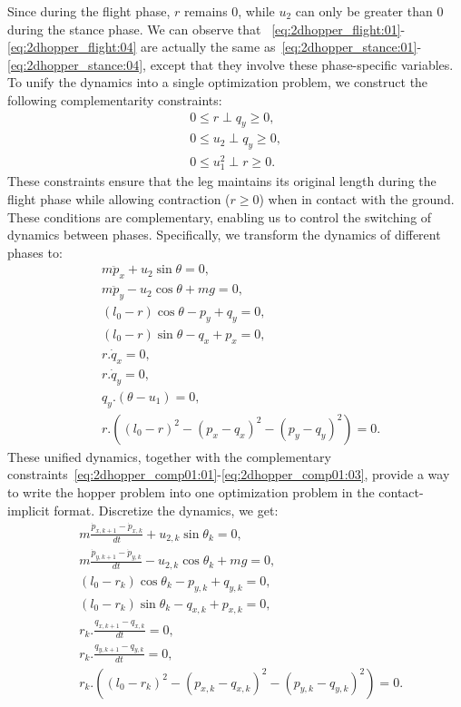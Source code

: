 Since during the flight phase, $r$ remains 0, while $u_2$ can only be greater than 0 during the stance phase. We can observe that ~\eqref{eq:2dhopper_flight:01}-\eqref{eq:2dhopper_flight:04} are actually the same as~\eqref{eq:2dhopper_stance:01}-\eqref{eq:2dhopper_stance:04}, except that they involve these phase-specific variables.
To unify the dynamics  into a single optimization problem, we construct the following complementarity constraints:
\begin{subequations}\label{eq:2dhopper_comp01}
    \begin{align}
   0 \leq r \perp q_y \geq 0,\label{eq:2dhopper_comp01:01}\\
   0 \leq u_2 \perp q_y \geq 0,\label{eq:2dhopper_comp01:02}\\
    0 \leq u_1^2 \perp r \geq 0. \label{eq:2dhopper_comp01:03}
\end{align}
\end{subequations}
These constraints ensure that the leg maintains its original length during the flight phase while allowing contraction ($r \geq 0$) when in contact with the ground. These conditions are complementary, enabling us to control the switching of dynamics between phases. Specifically, we transform the dynamics of different phases to:
    \begin{align}
        &m\ddot{p}_x + u_2\sin\theta = 0,\\
        &m\ddot{p}_y - u_2\cos\theta + mg  =0,\\
        &(l_0-r)\cos\theta - p_y + q_y=0,\\
        &(l_0-r)\sin\theta - q_x + p_x=0,\\
        &r.\dot{q}_x = 0,\\
        &r.\dot{q}_y = 0,\\
        &q_y.(\theta-u_1)=0,\\
        &r.\left((l_0-r)^2-(p_x -q_x)^2 - (p_y - q_y)^2\right)=0.
    \end{align}
These unified dynamics, together with the complementary constraints~\eqref{eq:2dhopper_comp01:01}-\eqref{eq:2dhopper_comp01:03}, provide a way to write the hopper problem into one optimization problem in the contact-implicit format.
Discretize the dynamics, we get:
    \begin{align}
        &m\frac{\dot{p}_{x,k+1}-\dot{p}_{x,k}}{dt} + u_{2,k}\sin\theta_k = 0,\\
        &m\frac{\dot{p}_{y,k+1}-\dot{p}_{y,k}}{dt} - u_{2,k}\cos\theta_k + mg  =0,\\
        &(l_0-r_k)\cos\theta_k - p_{y,k} + q_{y,k}=0,\\
        &(l_0-r_k)\sin\theta_k - q_{x,k} + p_{x,k}=0,\\
        &r_k.\frac{q_{x,k+1}-q_{x,k}}{dt} = 0,\\
        &r_k.\frac{q_{y,k+1}-q_{y,k}}{dt} = 0,\\
        &r_k.\left((l_0-r_k)^2-(p_{x,k} -q_{x,k})^2 - (p_{y,k} - q_{y,k})^2\right)=0.
    \end{align}

